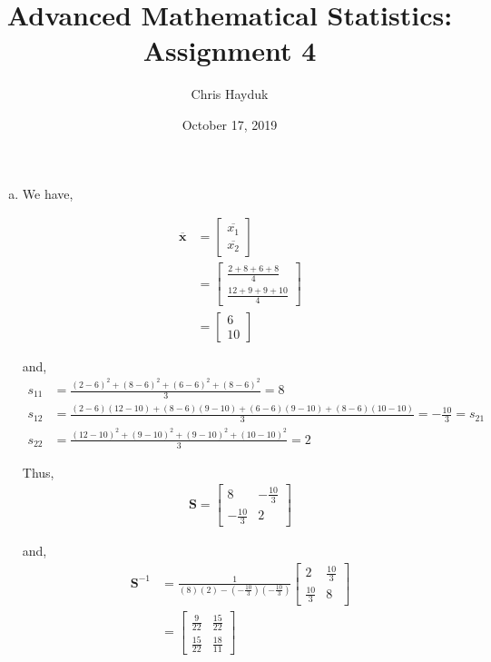 \documentclass[12pt]{article}\usepackage[]{graphicx}\usepackage[]{color}
\newenvironment{problem}[2][Problem]{\begin{trivlist}
\item[\hskip \labelsep {\bfseries #1}\hskip \labelsep {\bfseries #2.}]}{\end{trivlist}}
\newcommand{\vct}{\mathbf}
\begin{document}
\title{Advanced Mathematical Statistics: Assignment 4}

\author{Chris Hayduk}
\date{October 17, 2019}

\maketitle



\begin{problem}{5.1}
\end{problem}

\begin{enumerate}[a)]

\item We have,

\begin{align*}
\vct{\overline{x}} &= \begin{bmatrix} \overline{x_1} \\ \overline{x_2} \end{bmatrix}\\
&= \begin{bmatrix} \frac{2 + 8 + 6 + 8}{4} \\ \frac{12 + 9 + 9 + 10}{4} \end{bmatrix}\\
&= \begin{bmatrix} 6 \\ 10 \end{bmatrix}
\end{align*}

and,
\begin{align*}
s_{11} &= \frac{(2-6)^2 + (8-6)^2 + (6-6)^2 + (8-6)^2}{3} = 8\\
s_{12} &= \frac{(2-6)(12-10) + (8-6)(9-10) + (6-6)(9-10) + (8-6)(10-10)}{3} = -\frac{10}{3} = s_{21}\\
s_{22} &= \frac{(12-10)^2 + (9-10)^2 + (9-10)^2 + (10-10)^2}{3} = 2
\end{align*}

Thus,
\begin{align*}
\vct{S} = \begin{bmatrix} 8 & -\frac{10}{3} \\ -\frac{10}{3} & 2 \end{bmatrix}
\end{align*}

and,
\begin{align*}
\vct{S}^{-1} &= \frac{1}{(8)(2) - (-\frac{10}{3})(-\frac{10}{3})} \begin{bmatrix} 2 & \frac{10}{3} \\ \frac{10}{3} & 8 \end{bmatrix}\\
&= \begin{bmatrix} \frac{9}{22} & \frac{15}{22} \\ \frac{15}{22} & \frac{18}{11} \end{bmatrix}
\end{align*}


\end{enumerate}
\end{document}
